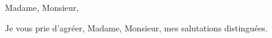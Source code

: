\documentclass[11pt,french,signature]{epistola}
\begin{document}
\address{John Doe\\42, route de Paris\\69000 Lyon}

\location{}
\date{\today}


\opening{Madame, Monsieur,}

\lipsum[1-2]

\closing{Je vous prie d'agréer, Madame, Monsieur, mes salutations distinguées.}
\end{document}

